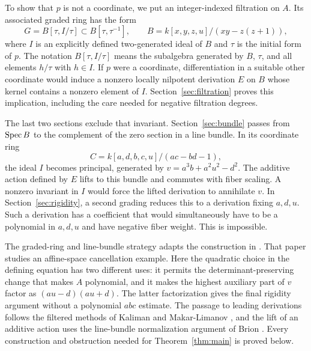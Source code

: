 To show that $p$ is not a coordinate, we put an integer-indexed filtration on $A$. Its associated graded ring has the form
\[
 G=B[\tau,I/\tau]\subset B[\tau,\tau^{-1}],
 \qquad B=k[x,y,z,u]/(xy-z(z+1)),
\]
where $I$ is an explicitly defined two-generated ideal of $B$ and $\tau$ is the initial form of $p$. The notation $B[\tau,I/\tau]$ means the subalgebra generated by $B$, $\tau$, and all elements $h/\tau$ with $h\in I$. If $p$ were a coordinate, differentiation in a suitable other coordinate would induce a nonzero locally nilpotent derivation $E$ on $B$ whose kernel contains a nonzero element of $I$. Section~\ref{sec:filtration} proves this implication, including the care needed for negative filtration degrees.

The last two sections exclude that invariant. Section~\ref{sec:bundle} passes from $\operatorname{Spec} B$ to the complement of the zero section in a line bundle. In its coordinate ring
\[
 C=k[a,d,b,c,u]/(ac-bd-1),
\]
the ideal $I$ becomes principal, generated by $v=a^3b+a^2u^2-d^2$. The additive action defined by $E$ lifts to this bundle and commutes with fiber scaling. A nonzero invariant in $I$ would force the lifted derivation to annihilate $v$. In Section~\ref{sec:rigidity}, a second grading reduces this to a derivation fixing $a,d,u$. Such a derivation has a coefficient that would simultaneously have to be a polynomial in $a,d,u$ and have negative fiber weight. This is impossible.

The graded-ring and line-bundle strategy adapts the construction in \cite[Sections~2--6]{Cancellation2026}. That paper studies an affine-space cancellation example. Here the quadratic choice in the defining equation has two different uses: it permits the determinant-preserving change that makes $A$ polynomial, and it makes the highest auxiliary part of $v$ factor as $(au-d)(au+d)$. The latter factorization gives the final rigidity argument without a polynomial $abc$ estimate. The passage to leading derivations follows the filtered methods of Kaliman and Makar-Limanov \cite[Sections~3--5]{KalimanMakarLimanov2007}, and the lift of an additive action uses the line-bundle normalization argument of Brion \cite[Lemma~2.9]{Brion2015}. Every construction and obstruction needed for Theorem~\ref{thm:main} is proved below.

